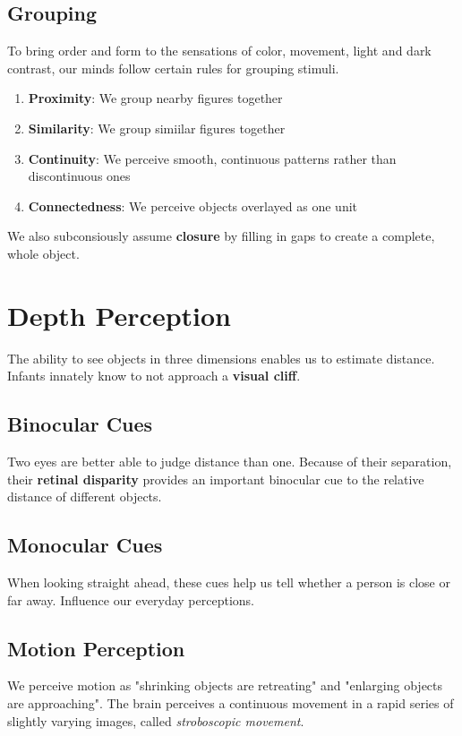 \documentclass[12pt]{article}
\begin{document}
\subsection*{Grouping}
To bring order and form to the sensations of color, movement, light and dark contrast, our minds follow certain rules for grouping stimuli.

\begin{enumerate}
\item {\bf Proximity}: We group nearby figures together
\item {\bf Similarity}: We group simiilar figures together
\item {\bf Continuity}: We perceive smooth, continuous patterns rather than discontinuous ones
\item {\bf Connectedness}: We perceive objects overlayed as one unit
\end{enumerate}

We also subconsiously assume {\bf closure} by filling in gaps to create a complete, whole object.

\section*{Depth Perception}
The ability to see objects in three dimensions enables us to estimate distance. Infants innately know to not approach a \textbf{visual cliff}. 

\subsection*{Binocular Cues}
Two eyes are better able to judge distance than one. Because of their separation, their \textbf{retinal disparity} provides an important binocular cue to the relative distance of different objects.

\subsection*{Monocular Cues}
When looking straight ahead, these cues help us tell whether a person is close or far away. Influence our everyday perceptions.

\subsection*{Motion Perception}
We perceive motion as "shrinking objects are retreating" and "enlarging objects are approaching". The brain perceives a continuous movement in a rapid series of slightly varying images, called \textit{stroboscopic movement}.
\end{document}
